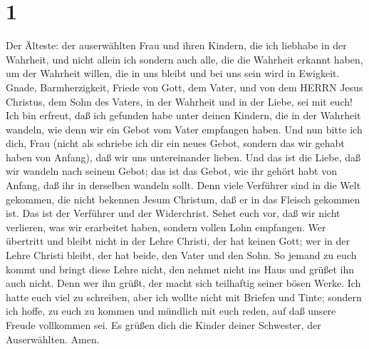 \hypertarget{section}{%
\section{1}\label{section}}

 Der Älteste: der auserwählten Frau und ihren Kindern, die
ich liebhabe in der Wahrheit, und nicht allein ich sondern auch alle,
die die Wahrheit erkannt haben,  um der Wahrheit willen, die
in uns bleibt und bei uns sein wird in Ewigkeit.  Gnade,
Barmherzigkeit, Friede von Gott, dem Vater, und von dem HERRN Jesus
Christus, dem Sohn des Vaters, in der Wahrheit und in der Liebe, sei mit
euch!  Ich bin erfreut, daß ich gefunden habe unter deinen
Kindern, die in der Wahrheit wandeln, wie denn wir ein Gebot vom Vater
empfangen haben.  Und nun bitte ich dich, Frau (nicht als
schriebe ich dir ein neues Gebot, sondern das wir gehabt haben von
Anfang), daß wir uns untereinander lieben.  Und das ist die
Liebe, daß wir wandeln nach seinem Gebot; das ist das Gebot, wie ihr
gehört habt von Anfang, daß ihr in derselben wandeln sollt. 
Denn viele Verführer sind in die Welt gekommen, die nicht bekennen Jesum
Christum, daß er in das Fleisch gekommen ist. Das ist der Verführer und
der Widerchrist.  Sehet euch vor, daß wir nicht verlieren,
was wir erarbeitet haben, sondern vollen Lohn empfangen. 
Wer übertritt und bleibt nicht in der Lehre Christi, der hat keinen
Gott; wer in der Lehre Christi bleibt, der hat beide, den Vater und den
Sohn.  So jemand zu euch kommt und bringt diese Lehre
nicht, den nehmet nicht ins Haus und grüßet ihn auch nicht.
 Denn wer ihn grüßt, der macht sich teilhaftig seiner bösen
Werke.  Ich hatte euch viel zu schreiben, aber ich wollte
nicht mit Briefen und Tinte; sondern ich hoffe, zu euch zu kommen und
mündlich mit euch reden, auf daß unsere Freude vollkommen sei.
 Es grüßen dich die Kinder deiner Schwester, der
Auserwählten. Amen.
